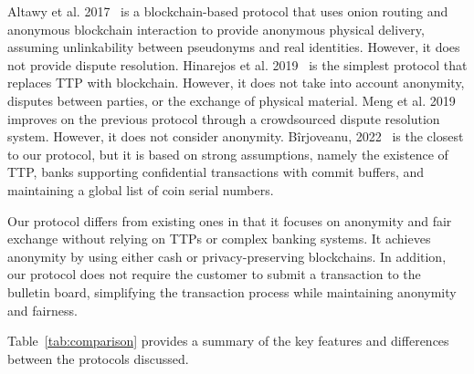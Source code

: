 \documentclass[pdftex,twocolumn,epjc3]{svjour3}
\begin{document}
\begin{sloppypar}
Altawy et al. 2017~\cite{altawyLelantosBlockchainBasedAnonymous2017} is a blockchain-based protocol that uses onion routing and anonymous blockchain interaction to provide anonymous physical delivery, assuming unlinkability between pseudonyms and real identities. However, it does not provide dispute resolution.
Hinarejos et al. 2019~\cite{hinarejosSolutionSecureCertified2019} is the simplest protocol that replaces TTP with blockchain. However, it does not take into account anonymity, disputes between parties, or the exchange of physical material.
Meng et al. 2019~\cite{mengThemisDecentralizedEscrow2019} improves on the previous protocol through a crowdsourced dispute resolution system. However, it does not consider anonymity.
Bîrjoveanu, 2022~\cite{birjoveanuTwoPartyECommerceProtocols2022} is the closest to our protocol, but it is based on strong assumptions, namely the existence of TTP, banks supporting confidential transactions with commit buffers, and maintaining a global list of coin serial numbers.
\end{sloppypar}

Our protocol differs from existing ones in that it focuses on anonymity and fair exchange without relying on TTPs or complex banking systems. It achieves anonymity by using either cash or privacy-preserving blockchains. In addition, our protocol does not require the customer to submit a transaction to the bulletin board, simplifying the transaction process while maintaining anonymity and fairness.

Table~\ref{tab:comparison} provides a summary of the key features and differences between the protocols discussed.
\end{document}
